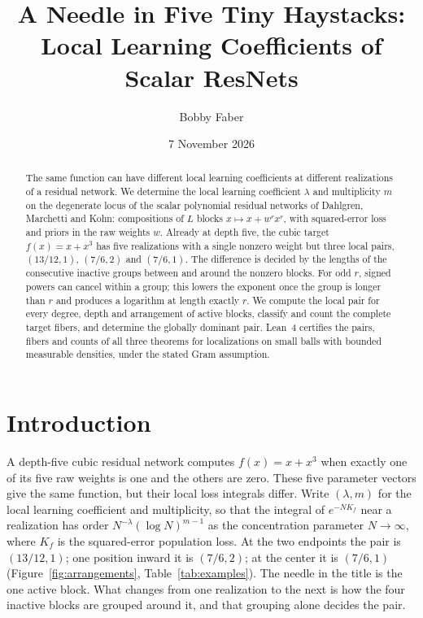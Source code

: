 \documentclass[11pt,letterpaper]{amsart}
\title[A Needle in Five Tiny Haystacks]{A Needle in Five Tiny Haystacks:\\Local Learning Coefficients of Scalar ResNets}
\author{Bobby Faber}
\date{7 November 2026}
\theoremstyle{scplain}
\begin{document}
\begin{abstract}
The same function can have different local learning coefficients at different realizations of a residual network. We determine the local learning coefficient $\lambda$ and multiplicity $m$ on the degenerate locus of the scalar polynomial residual networks of Dahlgren, Marchetti and Kohn: compositions of $L$ blocks $x\mapsto x+w^rx^r$, with squared-error loss and priors in the raw weights $w$. Already at depth five, the cubic target $f(x)=x+x^3$ has five realizations with a single nonzero weight but three local pairs, $(13/12,1)$, $(7/6,2)$ and $(7/6,1)$. The difference is decided by the lengths of the consecutive inactive groups between and around the nonzero blocks. For odd $r$, signed powers can cancel within a group; this lowers the exponent once the group is longer than $r$ and produces a logarithm at length exactly $r$. We compute the local pair for every degree, depth and arrangement of active blocks, classify and count the complete target fibers, and determine the globally dominant pair. Lean~4 certifies the pairs, fibers and counts of all three theorems for localizations on small balls with bounded measurable densities, under the stated Gram assumption.
\end{abstract}
\maketitle

\section{Introduction}
A depth-five cubic residual network computes $f(x)=x+x^3$ when exactly one of its five raw weights is one and the others are zero. These five parameter vectors give the same function, but their local loss integrals differ. Write $(\lambda,m)$ for the local learning coefficient and multiplicity, so that the integral of $e^{-NK_f}$ near a realization has order $N^{-\lambda}(\log N)^{m-1}$ as the concentration parameter $N\to\infty$, where $K_f$ is the squared-error population loss. At the two endpoints the pair is $(13/12,1)$; one position inward it is $(7/6,2)$; at the center it is $(7/6,1)$ (Figure~\ref{fig:arrangements}, Table~\ref{tab:examples}). The needle in the title is the one active block. What changes from one realization to the next is how the four inactive blocks are grouped around it, and that grouping alone decides the pair.
\end{document}
